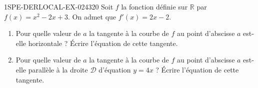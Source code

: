 \begin{exercice}{1SPE-DERLOCAL-EX-024}{3}{20}
Soit $f$ la fonction définie sur $\mathbb{R}$ par $f(x) = x^2 - 2x + 3$. On admet que $f'(x) = 2x - 2$.

\begin{enumerate}
  \item Pour quelle valeur de $a$ la tangente à la courbe de $f$ au point d'abscisse $a$ est-elle horizontale ? Écrire l'équation de cette tangente.
  \item Pour quelle valeur de $a$ la tangente à la courbe de $f$ au point d'abscisse $a$ est-elle parallèle à la droite $\mathcal{D}$ d'équation $y = 4x$ ? Écrire l'équation de cette tangente.
\end{enumerate}
\end{exercice}
